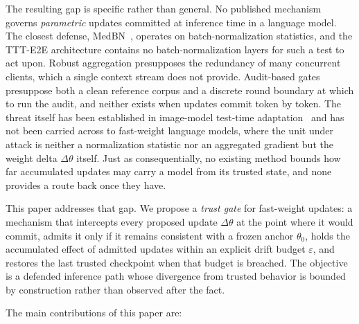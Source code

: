 \documentclass[journal]{IEEEtran}
\newcommand{\anchorp}{\theta_{0}}
\newcommand{\dtheta}{\Delta\theta}
\newcommand{\budget}{\varepsilon}
\begin{document}
The resulting gap is specific rather than general. No published mechanism governs
\emph{parametric} updates committed at inference time in a language model. The
closest defense, MedBN~\cite{park2024medbn}, operates on batch-normalization
statistics, and the TTT-E2E architecture contains no batch-normalization layers for
such a test to act upon. Robust aggregation presupposes the redundancy of many
concurrent clients, which a single context stream does not provide. Audit-based
gates presuppose both a clean reference corpus and a discrete round boundary at
which to run the audit, and neither exists when updates commit token by token. The
threat itself has been established in image-model test-time
adaptation~\cite{cong2024ttp,su2025realistic,hoang2024rip} and has not been carried
across to fast-weight language models, where the unit under attack is neither a
normalization statistic nor an aggregated gradient but the weight delta $\dtheta$
itself. Just as consequentially, no existing method bounds how far accumulated
updates may carry a model from its trusted state, and none provides a route back
once they have.

This paper addresses that gap. We propose a \emph{trust gate} for fast-weight
updates: a mechanism that intercepts every proposed update $\dtheta$ at the point
where it would commit, admits it only if it remains consistent with a frozen anchor
$\anchorp$, holds the accumulated effect of admitted updates within an explicit
drift budget $\budget$, and restores the last trusted checkpoint when that budget is
breached. The objective is a defended inference path whose divergence from trusted
behavior is bounded by construction rather than observed after the fact.

The main contributions of this paper are:
\end{document}
